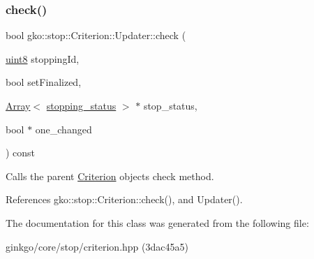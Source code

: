 \subsubsection{\texorpdfstring{check()}{check()}}
{\footnotesize\ttfamily bool gko\+::stop\+::\+Criterion\+::\+Updater\+::check (\begin{DoxyParamCaption}\item[{\hyperlink{namespacegko_a3950fc3732811a8563484e5098c31531}{uint8}}]{stopping\+Id,  }\item[{bool}]{set\+Finalized,  }\item[{\hyperlink{classgko_1_1Array}{Array}$<$ \hyperlink{classgko_1_1stopping__status}{stopping\+\_\+status} $>$ $\ast$}]{stop\+\_\+status,  }\item[{bool $\ast$}]{one\+\_\+changed }\end{DoxyParamCaption}) const\hspace{0.3cm}{\ttfamily [inline]}}



Calls the parent \hyperlink{classgko_1_1stop_1_1Criterion}{Criterion} object\textquotesingle{}s check method. 



References gko\+::stop\+::\+Criterion\+::check(), and Updater().



The documentation for this class was generated from the following file\+:\begin{DoxyCompactItemize}
\item 
ginkgo/core/stop/criterion.\+hpp (3dac45a5)\end{DoxyCompactItemize}
